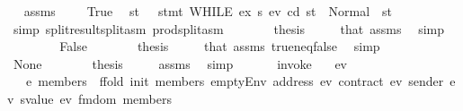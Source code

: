 \begin{isabellebody}
\ \isamarkupfalse%
\ assms\ {}\ {}\ {}\ {}\ True\ \isamarkupfalse%
\ st{\isacharprime}{\kern0pt}{\isacharprime}{\kern0pt}\ \ {}{\isacharcolon}{\kern0pt}\ {\isachardoublequoteopen}stmt\ {\isacharparenleft}{\kern0pt}WHILE\ ex\ s{}{\isacharparenright}{\kern0pt}\ ev\ cd\ st{\isacharprime}{\kern0pt}\ {\isacharequal}{\kern0pt}\ Normal\ {\isacharparenleft}{\kern0pt}{\isacharparenleft}{\kern0pt}{\isacharparenright}{\kern0pt}{\isacharcomma}{\kern0pt}\ st{\isacharprime}{\kern0pt}{\isacharprime}{\kern0pt}{\isacharparenright}{\kern0pt}{\isachardoublequoteclose}\ \isamarkupfalse%
\ {\isacharparenleft}{\kern0pt}simp\ split{\isacharcolon}{\kern0pt}result{\isachardot}{\kern0pt}split{\isacharunderscore}{\kern0pt}asm\ prod{\isachardot}{\kern0pt}split{\isacharunderscore}{\kern0pt}asm{\isacharparenright}{\kern0pt}\isanewline
\ \ \ \ \isamarkupfalse%
\ \isamarkupfalse%
\ {\isacharquery}{\kern0pt}thesis\ \isamarkupfalse%
\ {}\ {}\ {}\ that{\isacharparenleft}{\kern0pt}{}{\isacharparenright}{\kern0pt}\ assms\ \isamarkupfalse%
\ simp\isanewline
\ \ \isamarkupfalse%
\isanewline
\ \ \ \ \isamarkupfalse%
\ False\isanewline
\ \ \ \ \isamarkupfalse%
\ \isamarkupfalse%
\ {\isacharquery}{\kern0pt}thesis\ \isamarkupfalse%
\ {}\ {}\ {}\ that{\isacharparenleft}{\kern0pt}{}{\isacharparenright}{\kern0pt}\ assms\ true{\isacharunderscore}{\kern0pt}neq{\isacharunderscore}{\kern0pt}false\ \isamarkupfalse%
\ simp\isanewline
\ \ \isamarkupfalse%
\isanewline
\ \ \ \ \isamarkupfalse%
\ None\isanewline
\ \ \ \ \isamarkupfalse%
\ \isamarkupfalse%
\ {\isacharquery}{\kern0pt}thesis\ \isamarkupfalse%
\ {}\ {}\ {}\ assms\ \isamarkupfalse%
\ simp\isanewline
\ \ \isamarkupfalse%
\isanewline
{}\isamarkupfalse%
%
\endisatagproof
{\isafoldproof}%
%
\isadelimproof
\ \ \isanewline
%
\endisadelimproof
\isanewline
{}\isamarkupfalse%
\ invoke{\isacharcolon}{\kern0pt}\isanewline
\ \ \ ev\isanewline
\ \ \ {\isachardoublequoteopen}e{\isacharprime}{\kern0pt}\ members\ {\isasymequiv}\ ffold\ {\isacharparenleft}{\kern0pt}init\ members{\isacharparenright}{\kern0pt}\ {\isacharparenleft}{\kern0pt}emptyEnv\ {\isacharparenleft}{\kern0pt}address\ ev{\isacharparenright}{\kern0pt}\ {\isacharparenleft}{\kern0pt}contract\ ev{\isacharparenright}{\kern0pt}\ {\isacharparenleft}{\kern0pt}sender\ ev{\isacharparenright}{\kern0pt}\ {\isacharparenleft}{\kern0pt}svalue\ ev{\isacharparenright}{\kern0pt}{\isacharparenright}{\kern0pt}\ {\isacharparenleft}{\kern0pt}fmdom\ members{\isacharparenright}{\kern0pt}{\isachardoublequoteclose}\isanewline

\end{isabellebody}
